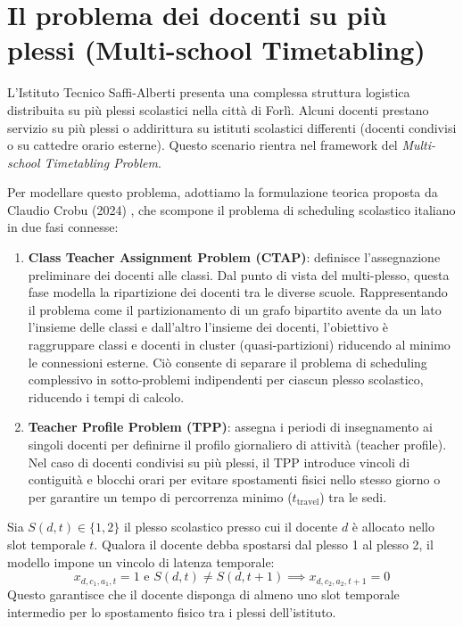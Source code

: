 \section{Il problema dei docenti su più plessi (Multi-school Timetabling)}
\label{sec:multi-school-crobu}

L'Istituto Tecnico Saffi-Alberti presenta una complessa struttura logistica distribuita su più plessi scolastici nella città di Forlì. Alcuni docenti prestano servizio su più plessi o addirittura su istituti scolastici differenti (docenti condivisi o su cattedre orario esterne). Questo scenario rientra nel framework del \textit{Multi-school Timetabling Problem}.

Per modellare questo problema, adottiamo la formulazione teorica proposta da Claudio Crobu (2024) \cite{crobu2024new}, che scompone il problema di scheduling scolastico italiano in due fasi connesse:
\begin{enumerate}
    \item \textbf{Class Teacher Assignment Problem (CTAP)}: definisce l'assegnazione preliminare dei docenti alle classi. Dal punto di vista del multi-plesso, questa fase modella la ripartizione dei docenti tra le diverse scuole. Rappresentando il problema come il partizionamento di un grafo bipartito avente da un lato l'insieme delle classi e dall'altro l'insieme dei docenti, l'obiettivo è raggruppare classi e docenti in cluster (quasi-partizioni) riducendo al minimo le connessioni esterne. Ciò consente di separare il problema di scheduling complessivo in sotto-problemi indipendenti per ciascun plesso scolastico, riducendo i tempi di calcolo.
    \item \textbf{Teacher Profile Problem (TPP)}: assegna i periodi di insegnamento ai singoli docenti per definirne il profilo giornaliero di attività (teacher profile). Nel caso di docenti condivisi su più plessi, il TPP introduce vincoli di contiguità e blocchi orari per evitare spostamenti fisici nello stesso giorno o per garantire un tempo di percorrenza minimo ($t_{\text{travel}}$) tra le sedi.
\end{enumerate}

Sia $S(d, t) \in \{1, 2\}$ il plesso scolastico presso cui il docente $d$ è allocato nello slot temporale $t$. Qualora il docente debba spostarsi dal plesso 1 al plesso 2, il modello impone un vincolo di latenza temporale:
\begin{equation}
x_{d,c_1,a_1,t} = 1 \text{ e } S(d, t) \neq S(d, t+1) \implies x_{d,c_2,a_2,t+1} = 0
\label{eq:spostamento-plesso}
\end{equation}
Questo garantisce che il docente disponga di almeno uno slot temporale intermedio per lo spostamento fisico tra i plessi dell'istituto.

